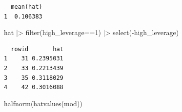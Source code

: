\documentclass[
  letterpaper,
  DIV=11,
  numbers=noendperiod]{scrartcl}
\newenvironment{Shaded}{\begin{snugshade}}{\end{snugshade}}
\newcommand{\DecValTok}[1]{\textcolor[rgb]{0.68,0.00,0.00}{#1}}
\newcommand{\FunctionTok}[1]{\textcolor[rgb]{0.28,0.35,0.67}{#1}}
\newcommand{\NormalTok}[1]{\textcolor[rgb]{0.00,0.23,0.31}{#1}}
\newcommand{\SpecialCharTok}[1]{\textcolor[rgb]{0.37,0.37,0.37}{#1}}
\begin{document}
\begin{verbatim}
  mean(hat)
1  0.106383
\end{verbatim}

\begin{Shaded}
\begin{Highlighting}[]
\NormalTok{hat }\SpecialCharTok{|\textgreater{}} \FunctionTok{filter}\NormalTok{(high\_leverage}\SpecialCharTok{==}\DecValTok{1}\NormalTok{) }\SpecialCharTok{|\textgreater{}} \FunctionTok{select}\NormalTok{(}\SpecialCharTok{{-}}\NormalTok{high\_leverage)}
\end{Highlighting}
\end{Shaded}

\begin{verbatim}
  rowid       hat
1    31 0.2395031
2    33 0.2213439
3    35 0.3118029
4    42 0.3016088
\end{verbatim}

\begin{Shaded}
\begin{Highlighting}[]
\FunctionTok{halfnorm}\NormalTok{(}\FunctionTok{hatvalues}\NormalTok{(mod))}
\end{Highlighting}
\end{Shaded}

\end{document}
